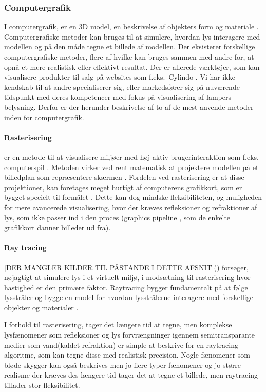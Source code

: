 \subsubsection{Computergrafik}
\label{sec:computergrafik}
I computergrafik, er en 3D model, en beskrivelse af objekters form og materiale \cite{computergrafik_introduktion}. Computergrafiske metoder kan bruges til at simulere, hvordan lys interagere med modellen og på den måde tegne et billede af modellen. Der eksisterer forskellige computergrafiske metoder, flere af hvilke kan bruges sammen med andre for, at opnå et mere realistisk eller effektivt resultat. Der er allerede værktøjer, som kan visualisere produkter til salg på websites som f.eks.\ Cylindo \cite{Cylindo}. Vi har ikke kendskab til at andre specialiserer sig, eller markedsfører sig på nuværende tidspunkt med deres kompetencer med fokus på visualisering af lampers belysning. Derfor er der herunder beskrivelse af to af de mest anvende metoder inden for computergrafik.

\paragraph{Rasterisering}
er en metode til at visualisere miljøer med høj aktiv brugerinteraktion som f.eks. computerspil \cite{rastarization}. Metoden virker ved rent matematisk at projektere modellen på et billedplan som repræsentere skærmen \cite{rastarization}. Fordelen ved rasterisering er at disse projektioner, kan foretages meget hurtigt af computerens grafikkort, som er bygget specielt til formålet \cite{rastarization}. Dette kan dog mindske fleksibiliteten, og muligheden for mere avancerede visualisering, hvor der kræves refleksioner og refraktioner af lys, som ikke passer ind i den proces (graphics pipeline \cite{rastarization}, som de enkelte grafikkort danner billeder ud fra). 

\paragraph{Ray tracing} [DER MANGLER KILDER TIL PÅSTANDE I DETTE AFSNIT]() forsøger, nøjagtigt at simulere lys i et virtuelt miljø, i modsætning til rasterisering hvor hastighed er den primære faktor. Raytracing bygger fundamentalt på at følge lysstråler og bygge en model for hvordan lysstrålerne interagere med forskellige objekter og materialer \cite{raytracing_for_begyndere}. 

I forhold til rasterisering, tager det længere tid at tegne, men komplekse lysfænomener som refleksioner og lys forvrængninger igennem semitransparante medier som vand(kaldet refraktion) er simple at beskrive for en raytracing algoritme, som kan tegne disse med realistisk precision. Nogle fænomener som bløde skygger kan også beskrives men jo flere typer fænomener og jo større realisme der kræves des længere tid tager det at tegne et billede, men raytracing tillader stor fleksibilitet.